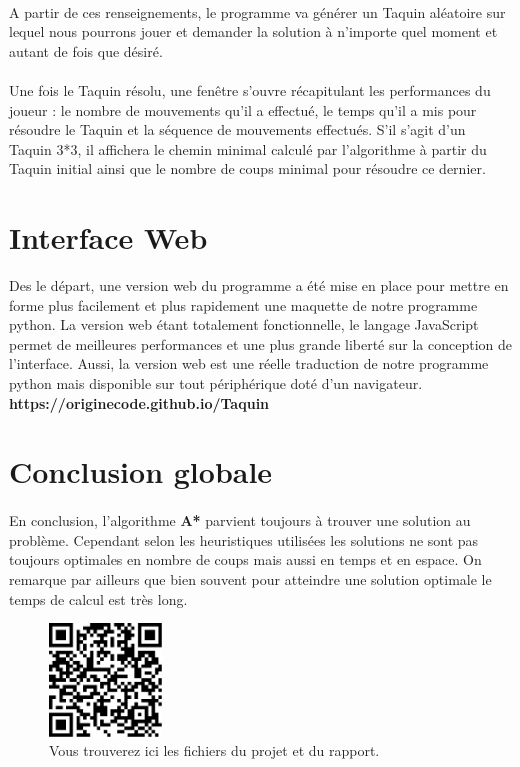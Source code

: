 \documentclass[10pt,a4paper]{report}
\begin{document}
\paragraph{}{A partir de ces renseignements, le programme va générer un Taquin aléatoire sur lequel nous pourrons jouer et demander la solution à n'importe quel moment et autant de fois que désiré.}
\paragraph{}{Une fois le Taquin résolu, une fenêtre s'ouvre récapitulant les performances du joueur : le nombre de mouvements qu'il a effectué, le temps qu'il a mis pour résoudre le Taquin et la séquence de mouvements effectués. S'il s'agit d'un Taquin 3*3, il affichera le chemin minimal calculé par l'algorithme à partir du Taquin initial ainsi que le nombre de coups minimal pour résoudre ce dernier.}
\section{Interface Web}{Des le départ, une version web du programme a été mise en place pour mettre en forme plus facilement et plus rapidement une maquette de notre programme python. La version web étant totalement fonctionnelle, le langage JavaScript permet de meilleures performances et une plus grande liberté sur la conception de l'interface. Aussi, la version web est une réelle traduction de notre programme python mais disponible sur tout périphérique doté d'un navigateur. {\ttfamily\bfseries https://originecode.github.io/Taquin}}
\section{Conclusion globale}
\paragraph{}{En conclusion, l'algorithme \textbf{A*} parvient toujours à trouver une solution au problème. Cependant selon les heuristiques utilisées les solutions ne sont pas toujours optimales en nombre de coups mais aussi en temps et en espace. On remarque par ailleurs que bien souvent pour atteindre une solution optimale le temps de calcul est très long.}

\begin{figure}[!h]
\vspace{1cm}
\centering
\includegraphics[keepaspectratio=true,width=3cm]{./qrcode.pdf}
\caption{Vous trouverez ici les fichiers du projet et du rapport.}
\end{figure}
\end{document}
